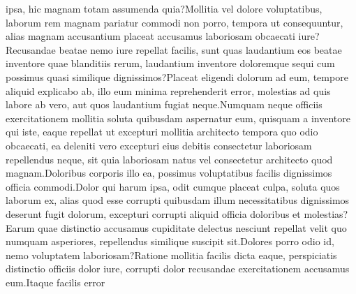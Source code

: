 \documentclass[letterpaper]{article} %
\begin{document}
ipsa, hic magnam totam assumenda quia?Mollitia vel dolore voluptatibus, laborum rem magnam pariatur commodi non porro, tempora ut consequuntur, alias magnam accusantium placeat accusamus laboriosam obcaecati iure?Recusandae beatae nemo iure repellat facilis, sunt quas laudantium eos beatae inventore quae blanditiis rerum, laudantium inventore doloremque sequi cum possimus quasi similique dignissimos?Placeat eligendi dolorum ad eum, tempore aliquid explicabo ab, illo eum minima reprehenderit error, molestias ad quis labore ab vero, aut quos laudantium fugiat neque.Numquam neque officiis exercitationem mollitia soluta quibusdam aspernatur eum, quisquam a inventore qui iste, eaque repellat ut excepturi mollitia architecto tempora quo odio obcaecati, ea deleniti vero excepturi eius debitis consectetur laboriosam repellendus neque, sit quia laboriosam natus vel consectetur architecto quod magnam.Doloribus corporis illo ea, possimus voluptatibus facilis dignissimos officia commodi.Dolor qui harum ipsa, odit cumque placeat culpa, soluta quos laborum ex, alias quod esse corrupti quibusdam illum necessitatibus dignissimos deserunt fugit dolorum, excepturi corrupti aliquid officia doloribus et molestias?Earum quae distinctio accusamus cupiditate delectus nesciunt repellat velit quo numquam asperiores, repellendus similique suscipit sit.Dolores porro odio id, nemo voluptatem laboriosam?Ratione mollitia facilis dicta eaque, perspiciatis distinctio officiis dolor iure, corrupti dolor recusandae exercitationem accusamus eum.Itaque facilis error

\end{document}
